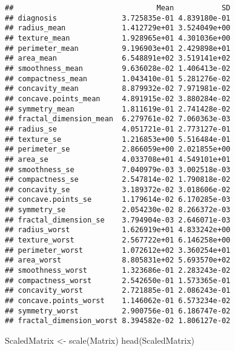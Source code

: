 \documentclass[
]{article}
\newenvironment{Shaded}{\begin{snugshade}}{\end{snugshade}}
\newcommand{\FunctionTok}[1]{\textcolor[rgb]{0.00,0.00,0.00}{#1}}
\newcommand{\NormalTok}[1]{#1}
\newcommand{\OtherTok}[1]{\textcolor[rgb]{0.56,0.35,0.01}{#1}}
\begin{document}
\begin{verbatim}
##                                 Mean           SD
## diagnosis               3.725835e-01 4.839180e-01
## radius_mean             1.412729e+01 3.524049e+00
## texture_mean            1.928965e+01 4.301036e+00
## perimeter_mean          9.196903e+01 2.429898e+01
## area_mean               6.548891e+02 3.519141e+02
## smoothness_mean         9.636028e-02 1.406413e-02
## compactness_mean        1.043410e-01 5.281276e-02
## concavity_mean          8.879932e-02 7.971981e-02
## concave.points_mean     4.891915e-02 3.880284e-02
## symmetry_mean           1.811619e-01 2.741428e-02
## fractal_dimension_mean  6.279761e-02 7.060363e-03
## radius_se               4.051721e-01 2.773127e-01
## texture_se              1.216853e+00 5.516484e-01
## perimeter_se            2.866059e+00 2.021855e+00
## area_se                 4.033708e+01 4.549101e+01
## smoothness_se           7.040979e-03 3.002518e-03
## compactness_se          2.547814e-02 1.790818e-02
## concavity_se            3.189372e-02 3.018606e-02
## concave.points_se       1.179614e-02 6.170285e-03
## symmetry_se             2.054230e-02 8.266372e-03
## fractal_dimension_se    3.794904e-03 2.646071e-03
## radius_worst            1.626919e+01 4.833242e+00
## texture_worst           2.567722e+01 6.146258e+00
## perimeter_worst         1.072612e+02 3.360254e+01
## area_worst              8.805831e+02 5.693570e+02
## smoothness_worst        1.323686e-01 2.283243e-02
## compactness_worst       2.542650e-01 1.573365e-01
## concavity_worst         2.721885e-01 2.086243e-01
## concave.points_worst    1.146062e-01 6.573234e-02
## symmetry_worst          2.900756e-01 6.186747e-02
## fractal_dimension_worst 8.394582e-02 1.806127e-02
\end{verbatim}

\begin{Shaded}
\begin{Highlighting}[]
\NormalTok{ScaledMatrix }\OtherTok{\textless{}{-}} \FunctionTok{scale}\NormalTok{(Matrix)}
\FunctionTok{head}\NormalTok{(ScaledMatrix)}
\end{Highlighting}
\end{Shaded}
\end{document}
